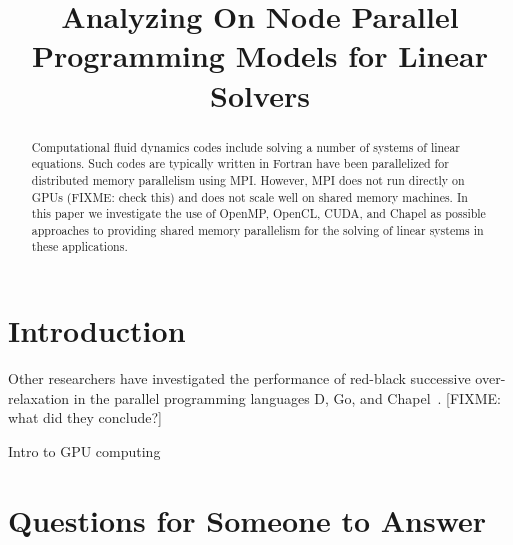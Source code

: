 \documentclass[conference]{IEEEtran}
\begin{document}
\title{Analyzing On Node Parallel Programming Models for Linear Solvers}


\author{
\and
{}
}

\maketitle

\begin{abstract}
Computational fluid dynamics codes include solving a number of systems of linear equations.
Such codes are typically written in Fortran have been parallelized for distributed memory parallelism
using MPI.  However, MPI does not run directly on GPUs (FIXME: check this)
and does not scale well on shared memory machines.
In this paper we investigate the use of OpenMP, OpenCL, CUDA, and Chapel
as possible approaches to providing shared memory parallelism for the solving of linear
systems in these applications.
\end{abstract}

\IEEEpeerreviewmaketitle


\section{Introduction}


Other researchers have investigated the performance of red-black successive over-relaxation 
in the parallel programming languages D, Go, and Chapel~\cite{Mittal2014}.
[FIXME: what did they conclude?]


Intro to GPU computing~\cite{Nickolls2010}

\section{Questions for Someone to Answer}
\end{document}
